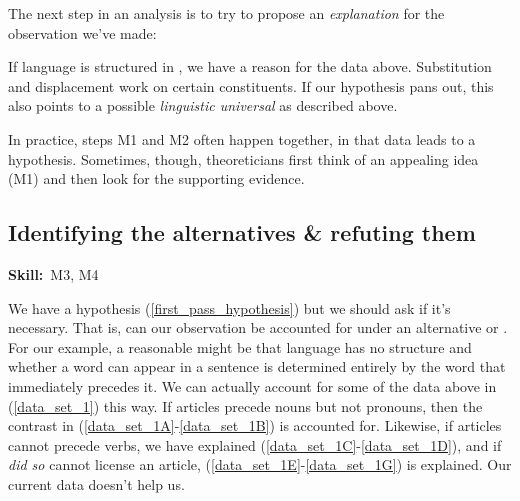 \documentclass{article}
\begin{document}
\begin{exe}
    \label{data_set_1}
\end{exe}

The next step in an analysis is to try to propose an \emph{explanation} for the observation we've made:
\begin{exe}
    \label{first_pass_hypothesis}
\end{exe}
If language is structured in , we have a reason for the data above.
Substitution and displacement work on certain constituents.
If our hypothesis pans out, this also points to a possible \emph{linguistic universal} as described above. 

In practice, steps M1 and M2 often happen together, in that data leads to a hypothesis. Sometimes, though, theoreticians first think of an appealing idea (M1) and then look for the supporting evidence.

\subsection{Identifying the alternatives \& refuting them}
\hfill{}\textbf{Skill:}~M3, M4%

We have a hypothesis (\ref{first_pass_hypothesis}) but we should ask if it's necessary.
That is, can our observation be accounted for under an alternative or .
For our example, a reasonable  might be that language has no structure and whether a word can appear in a sentence is determined entirely by the word that immediately precedes it.
We can actually account for some of the data above in (\ref{data_set_1}) this way.
If articles precede nouns but not pronouns, then the contrast in (\ref{data_set_1A}-\ref{data_set_1B}) is accounted for.
Likewise, if articles cannot precede verbs, we have explained (\ref{data_set_1C}-\ref{data_set_1D}), and if \emph{did so} cannot license an article, (\ref{data_set_1E}-\ref{data_set_1G}) is explained.
Our current data doesn't help us.
\end{document}
